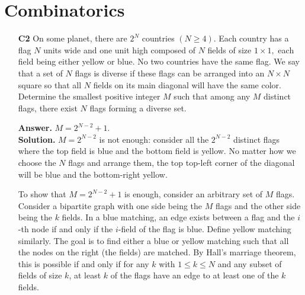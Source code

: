 \documentclass[12pt]{article}
\newcommand{\<}{\langle}
\renewcommand{\>}{\rangle}
\begin{document}
\section*{Combinatorics}
\begin{enumerate}
	\item [\textbf{C2}] On some planet, there are $2^N$ countries $(N \geq 4).$ Each country has a flag $N$ units wide and one unit high composed of $N$ fields of size $1 \times 1,$ each field being either yellow or blue. No two countries have the same flag. We say that a set of $N$ flags is diverse if these flags can be arranged into an $N \times N$ square so that all $N$ fields on its main diagonal will have the same color. Determine the smallest positive integer $M$ such that among any $M$ distinct flags, there exist $N$ flags forming a diverse set.
	
	\textbf{Answer.} $M=2^{N-2}+1$. \\
	\textbf{Solution.} $M=2^{N-2}$ is not enough: consider all the $2^{N-2}$ distinct flags where the top field is blue and the bottom field is yellow. No matter how we choose the $N$ flags and arrange them, the top top-left corner of the diagonal will be blue and the bottom-right yellow. 
	
	To show that $M=2^{N-2}+1$ is enough, consider an arbitrary set of $M$ flags. 
	Consider a bipartite graph with one side being the $M$ flags and the other side being the $k$ fields. In a blue matching, an edge exists between a flag and the $i$-th node if and only if the $i$-field of the flag is blue. Define yellow matching similarly. The goal is to find either a blue or yellow matching such that all the nodes on the right (the fields) are matched. 
	By Hall's marriage theorem, this is possible if and only if for any $k$ with $1\le k\le N$ and any subset of fields of size $k$, at least $k$ of the flags have an edge to at least one of the $k$ fields. 
	

\end{enumerate}
\end{document}
